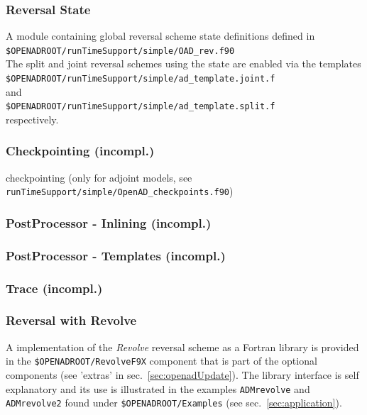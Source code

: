 \documentclass{book}
\newcommand{\refsec}[1]{{sec.~\ref{#1}}}
\begin{document}
\subsubsection{Reversal State}
A module containing global reversal scheme state definitions defined in  \\[1ex]
\hspace*{.3cm}\lstinline{$OPENADROOT/runTimeSupport/simple/OAD_rev.f90}\\[1ex] %
The split and joint reversal schemes using the state are enabled via the templates \\[1ex]
\hspace*{.3cm}\lstinline{$OPENADROOT/runTimeSupport/simple/ad_template.joint.f}\\[1ex] %
and\\[1ex]
\hspace*{.3cm}\lstinline{$OPENADROOT/runTimeSupport/simple/ad_template.split.f}\\[1ex] %
respectively.

\subsubsection{Checkpointing (incompl.)}

checkpointing (only  for adjoint models, see \lstinline{runTimeSupport/simple/OpenAD_checkpoints.f90})

\subsubsection{PostProcessor - Inlining (incompl.)}

\subsubsection{PostProcessor - Templates (incompl.)}

\subsubsection{Trace (incompl.)}

\subsubsection{Reversal with Revolve}
A implementation of the {\em Revolve} reversal scheme \cite{Griewank2000ARA} as a Fortran library 
is provided in the \lstinline{$OPENADROOT/RevolveF9X} component that is part of the optional
components (see 'extras' in \refsec{sec:openadUpdate}). The library interface is self explanatory 
and its use is illustrated in the examples \lstinline{ADMrevolve} and \lstinline{ADMrevolve2} 
found under \lstinline{$OPENADROOT/Examples} (see \refsec{sec:application}).
 
\end{document}
